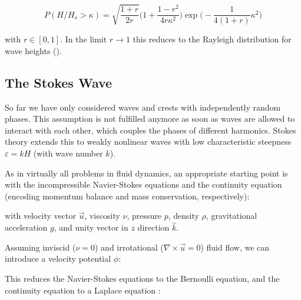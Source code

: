 \begin{equation}
    P(H / H_s > \kappa) = \sqrt{\frac{1 + r}{2 r}} \bigg( 1 + \frac{1-r^2}{4r\kappa^2} \bigg) \exp\bigg( -\frac{1}{4(1+r)} \kappa^2 \bigg) \label{eq:tayfun}
\end{equation}

with $r \in [0, 1]$. In the limit $r \to 1$ this reduces to the Rayleigh distribution for wave heights ().

\subsection{The Stokes Wave}

So far we have only considered waves and crests with independently random phases. This assumption is not fulfilled anymore as soon as waves are allowed to interact with each other, which couples the phases of different harmonics. Stokes theory extends this to weakly nonlinear waves with low characteristic steepness $\varepsilon = k H$ (with wave number $k$).

As in virtually all problems in fluid dynamics, an appropriate starting point is with the incompressible Navier-Stokes equations and the continuity equation (encoding momentum balance and mass conservation, respectively):


with velocity vector $\vec{u}$, viscosity $\nu$, pressure $p$, density $\rho$, gravitational acceleration $g$, and unity vector in $z$ direction $\hat{k}$.

Assuming inviscid ($\nu=0$) and irrotational ($\nabla \times \vec{u} = 0$) fluid flow, we can introduce a velocity potential $\phi$:


This reduces the Navier-Stokes equations to the Bernoulli equation, and the continuity equation to a Laplace equation \citep[see \eg][]{holthuijsen_waves_2010}:


